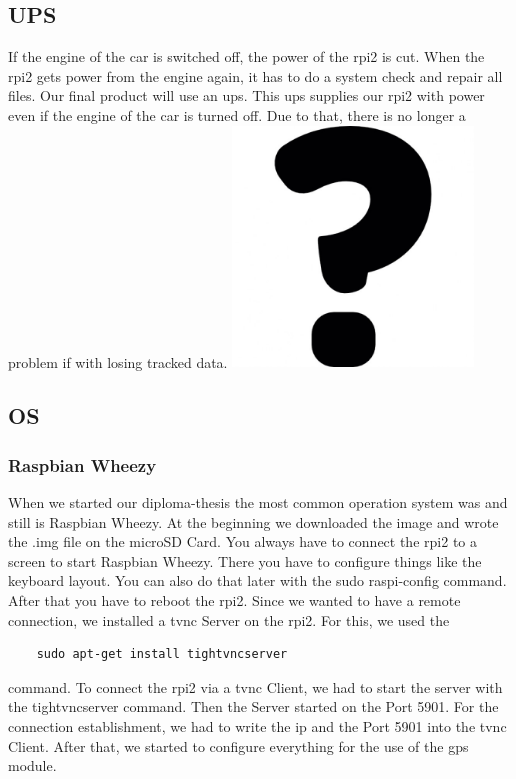 \subsection{UPS}
If the engine of the car is switched off, the power of the \gls{rpi2} is cut. When the \gls{rpi2} gets power from the engine again, it has to do a system check and repair all files. Our final product will use an \gls{ups}. This \gls{ups} supplies our \gls{rpi2} with power even if the engine of the car is turned off. Due to that, there is no longer a problem if with losing tracked data.\newline
\includegraphics[width=0.48\textwidth]{bilder/USV}
\newpage
\subsection{OS}
\subsubsection{Raspbian Wheezy}
When we started our diploma-thesis the most common operation system was and still is Raspbian Wheezy. At the beginning we downloaded the image and wrote the .img file on the microSD Card. You always have to connect the \gls{rpi2} to a screen to start Raspbian Wheezy. There you have to configure things like the keyboard layout. You can also do that later with the sudo raspi-config command. After that you have to reboot the \gls{rpi2}.
Since we wanted to have a remote connection, we installed a \gls{tvnc} Server on the \gls{rpi2}. For this, we used the  
\begin{verbatim}
	sudo apt-get install tightvncserver
\end{verbatim}
command.\newline
To connect the \gls{rpi2} via a \gls{tvnc} Client, we had to start the server with the tightvncserver command. Then the Server started on the Port 5901. For the connection establishment, we had to write the \gls{ip} and the Port 5901 into the \gls{tvnc} Client. After that, we started to configure everything for the use of the \gls{gps} module.
